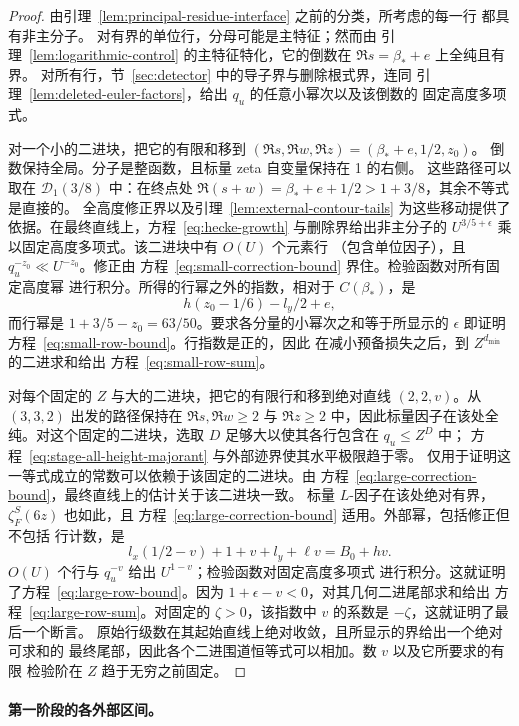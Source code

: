 \documentclass[11pt,a4paper]{article}
\numberwithin{equation}{section}
\numberwithin{figure}{section}
\theoremstyle{definition}
\theoremstyle{remark}
\begin{document}
\begin{proof}
由引理~\ref{lem:principal-residue-interface} 之前的分类，所考虑的每一行
都具有非主分子。
对有界的单位行，分母可能是主特征；然而由
引理~\ref{lem:logarithmic-control} 的主特征特化，它的倒数在
$\Re s=\beta_*+e$ 上全纯且有界。
对所有行，节~\ref{sec:detector} 中的导子界与删除根式界，连同
引理~\ref{lem:deleted-euler-factors}，给出 $q_u$ 的任意小幂次以及该倒数的
固定高度多项式。

对一个小的二进块，把它的有限和移到
$(\Re s,\Re w,\Re z)=(\beta_*+e,1/2,z_0)$。
倒数保持全局。分子是整函数，且标量 zeta 自变量保持在 1 的右侧。
这些路径可以取在 $\mathcal D_1(3/8)$ 中：在终点处
$\Re(s+w)=\beta_*+e+1/2>1+3/8$，其余不等式是直接的。
全高度修正界以及引理~\ref{lem:external-contour-tails} 为这些移动提供了
依据。在最终直线上，方程~\eqref{eq:hecke-growth} 与删除界给出非主分子的
$U^{3/5+\epsilon}$ 乘以固定高度多项式。该二进块中有 $O(U)$ 个元素行
（包含单位因子），且
$q_u^{-z_0}\ll U^{-z_0}$。修正由
方程~\eqref{eq:small-correction-bound} 界住。检验函数对所有固定高度幂
进行积分。所得的行幂之外的指数，相对于 $C(\beta_*)$，是
\[
 h(z_0-1/6)-l_y/2+e,
\]
而行幂是 $1+3/5-z_0=63/50$。要求各分量的小幂次之和等于所显示的
$\epsilon$ 即证明方程~\eqref{eq:small-row-bound}。行指数是正的，因此
在减小预备损失之后，到 $Z^{d_{\min}}$ 的二进求和给出
方程~\eqref{eq:small-row-sum}。

对每个固定的 $Z$ 与大的二进块，把它的有限行和移到绝对直线
$(2,2,v)$。从 $(3,3,2)$ 出发的路径保持在 $\Re s,\Re w\ge2$ 与
$\Re z\ge2$ 中，因此标量因子在该处全纯。对这个固定的二进块，选取
$D$ 足够大以使其各行包含在 $q_u\le Z^D$ 中；
方程~\eqref{eq:stage-all-height-majorant} 与外部迹界使其水平极限趋于零。
仅用于证明这一等式成立的常数可以依赖于该固定的二进块。由
方程~\eqref{eq:large-correction-bound}，最终直线上的估计关于该二进块一致。
标量 $L$-因子在该处绝对有界，$\zeta_F^S(6z)$ 也如此，且
方程~\eqref{eq:large-correction-bound} 适用。外部幂，包括修正但不包括
行计数，是
\[
 l_x(1/2-v)+1+v+l_y+\ell v=B_0+hv.
\]
$O(U)$ 个行与 $q_u^{-v}$ 给出 $U^{1-v}$；检验函数对固定高度多项式
进行积分。这就证明了方程~\eqref{eq:large-row-bound}。因为
$1+\epsilon-v<0$，对其几何二进尾部求和给出
方程~\eqref{eq:large-row-sum}。对固定的 $\zeta>0$，该指数中 $v$ 的系数是
$-\zeta$，这就证明了最后一个断言。
原始行级数在其起始直线上绝对收敛，且所显示的界给出一个绝对可求和的
最终尾部，因此各个二进围道恒等式可以相加。数 $v$ 以及它所要求的有限
检验阶在 $Z$ 趋于无穷之前固定。
\end{proof}

\paragraph{第一阶段的各外部区间。}
\end{document}
